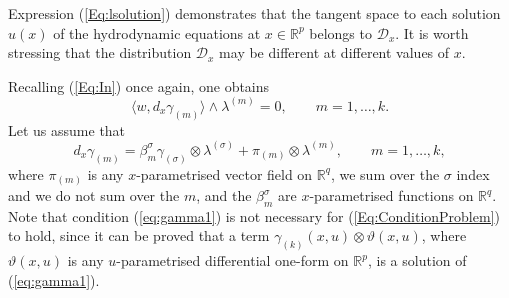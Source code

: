 \documentclass{birkjour}
\theoremstyle{definition}
\theoremstyle{remark}
\numberwithin{equation}{section}
\numberwithin{equation}{section}
\numberwithin{thm}{section}
\numberwithin{equation}{section}
\numberwithin{thm}{section}
\begin{document}
Expression (\ref{Eq:lsolution}) demonstrates that the tangent space to each solution $u(x)$ of the hydrodynamic equations at $x\in \mathbb{R}^p$  belongs to  $\mathcal{D}_x$. It is worth stressing  that the distribution $\mathcal{D}_x$ may be different at different values of $x$. %

Recalling  (\ref{Eq:In}) once again, one obtains
\begin{equation}\label{Eq:ConditionProblem}
	\langle w,d_x\gamma_{(m)}\rangle\wedge \lambda^{(m)}=0,\qquad m=1,\ldots,k.
\end{equation}
Let us assume that
\begin{equation}
	\label{eq:gamma1}
	d_x\gamma_{(m)}=\beta^\sigma_m\gamma_{(\sigma)}\otimes\lambda^{(\sigma)}+\pi_{(m)}\otimes \lambda^{(m)},\qquad m=1,\ldots,k,
\end{equation}
where $\pi_{(m)}$ is any $x$-parametrised vector field on $\mathbb{R}^q$, we sum over the $\sigma$ index and we do not sum over the $m$, and the $\beta^\sigma_m$ are $x$-parametrised functions on $\mathbb{R}^q$. Note that condition (\ref{eq:gamma1}) is not necessary for (\ref{Eq:ConditionProblem}) to hold, since it can be proved that a term $\gamma_{(k)}(x,u)\otimes \vartheta(x,u)$, where $\vartheta(x,u)$ is any $u$-parametrised differential one-form on $\mathbb{R}^p$, is a solution of (\ref{eq:gamma1}). 
\end{document}
